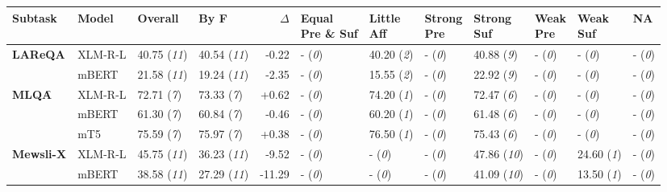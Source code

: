 \begin{tabular}{ll||llr|lllllll}
	\toprule
	 Subtask                                       & Model& \textbf{Overall} & \textbf{By F} & $\Delta$ & \makecell{Equal\\ Pre \& Suf} & \makecell{Little\\ Aff} & \makecell{Strong\\ Pre} & \makecell{Strong\\ Suf} & \makecell{Weak\\ Pre} & \makecell{Weak\\ Suf} & NA \\\midrule\midrule
	\multirow{2}{*}{\textbf{LAReQA}\map} & XLM-R-L & 40.75 (\textit{11}) & 40.54 (\textit{11}) & -0.22 & - (\textit{0}) & \cellcolor{low-color!40}  40.20 (\textit{2}) & - (\textit{0}) & \cellcolor{high-color!40}  40.88 (\textit{9}) & - (\textit{0}) & - (\textit{0}) & - (\textit{0}) \\
	 & mBERT & 21.58 (\textit{11}) & 19.24 (\textit{11}) & -2.35 & - (\textit{0}) & \cellcolor{low-color!40}  15.55 (\textit{2}) & - (\textit{0}) & \cellcolor{high-color!40}  22.92 (\textit{9}) & - (\textit{0}) & - (\textit{0}) & - (\textit{0}) \\\midrule
	\multirow{3}{*}{\textbf{MLQA}\f} & XLM-R-L & 72.71 (\textit{7}) & 73.33 (\textit{7}) & +0.62 & - (\textit{0}) & \cellcolor{low-color!40}  74.20 (\textit{1}) & - (\textit{0}) & \cellcolor{high-color!40}  72.47 (\textit{6}) & - (\textit{0}) & - (\textit{0}) & - (\textit{0}) \\
	 & mBERT & 61.30 (\textit{7}) & 60.84 (\textit{7}) & -0.46 & - (\textit{0}) & \cellcolor{low-color!40}  60.20 (\textit{1}) & - (\textit{0}) & \cellcolor{high-color!40}  61.48 (\textit{6}) & - (\textit{0}) & - (\textit{0}) & - (\textit{0}) \\
	 & mT5 & 75.59 (\textit{7}) & 75.97 (\textit{7}) & +0.38 & - (\textit{0}) & \cellcolor{low-color!40}  76.50 (\textit{1}) & - (\textit{0}) & \cellcolor{high-color!40}  75.43 (\textit{6}) & - (\textit{0}) & - (\textit{0}) & - (\textit{0}) \\\midrule
	\multirow{2}{*}{\textbf{Mewsli-X}\map} & XLM-R-L & 45.75 (\textit{11}) & 36.23 (\textit{11}) & -9.52 & - (\textit{0}) & - (\textit{0}) & - (\textit{0}) & \cellcolor{high-color!40}  47.86 (\textit{10}) & - (\textit{0}) & \cellcolor{low-color!40}  24.60 (\textit{1}) & - (\textit{0}) \\
	 & mBERT & 38.58 (\textit{11}) & 27.29 (\textit{11}) & -11.29 & - (\textit{0}) & - (\textit{0}) & - (\textit{0}) & \cellcolor{high-color!40}  41.09 (\textit{10}) & - (\textit{0}) & \cellcolor{low-color!40}  13.50 (\textit{1}) & - (\textit{0}) \\\midrule

\end{tabular}
